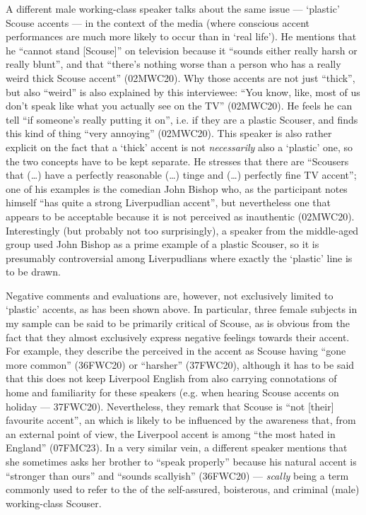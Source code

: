 A different male working-class speaker talks about the same issue --- `plastic' Scouse accents --- in the context of the media (where conscious accent performances are much more likely to occur than in `real life').
He mentions that he ``cannot stand [Scouse]'' on television because it ``sounds either really harsh or really blunt'', and that ``there's nothing worse than a person who has a really weird thick Scouse accent'' (02MWC20).
Why those accents are not just ``thick'', but also ``weird'' is also explained by this interviewee: ``You know, like, most of us don't speak like what you actually see on the TV'' (02MWC20).
He feels he can tell ``if someone's really putting it on'', i.e. if they are a plastic Scouser, and finds this kind of thing ``very annoying'' (02MWC20).
This speaker is also rather explicit on the fact that a `thick' accent is not \emph{necessarily} also a `plastic' one, so the two concepts have to be kept separate.
He stresses that there are ``Scousers that (\ldots) have a perfectly reasonable (\ldots) tinge and (\ldots) perfectly fine TV accent''; one of his examples is the comedian John Bishop who, as the participant notes himself ``has quite a strong Liverpudlian accent'', but nevertheless one that appears to be acceptable because it is not perceived as inauthentic (02MWC20).
Interestingly (but probably not too surprisingly), a speaker from the middle-aged group used John Bishop as a prime example of a plastic Scouser, so it is presumably controversial among Liverpudlians where exactly the `plastic' line is to be drawn.

Negative comments and evaluations are, however, not exclusively limited to `plastic' accents, as has been shown above.
In particular, three female subjects in my sample can be said to be primarily critical of Scouse, as is obvious from the fact that they almost exclusively express negative feelings towards their accent.
For example, they describe the perceived  in the accent as Scouse having ``gone more common'' (36FWC20) or ``harsher'' (37FWC20), although it has to be said that this does not keep Liverpool English from also carrying connotations of home and familiarity for these speakers (e.g. when hearing Scouse accents on holiday --- 37FWC20).
Nevertheless, they remark that Scouse is ``not [their] favourite accent'', an  which is likely to be influenced by the awareness that, from an external point of view, the Liverpool accent is among ``the most hated in England'' (07FMC23).
In a very similar vein, a different speaker mentions that she sometimes asks her brother to ``speak properly'' because his natural accent is ``stronger than ours'' and ``sounds scallyish'' (36FWC20) --- \emph{scally} being a term commonly used to refer to the  of the self-assured, boisterous, and criminal (male) working-class Scouser.

